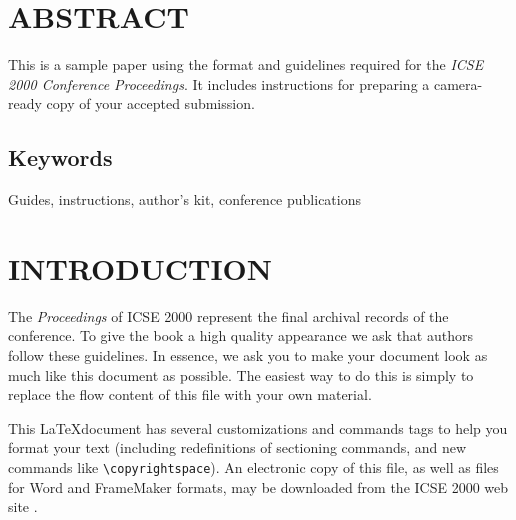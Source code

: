 
\thispagestyle{empty}  %




\section*{ABSTRACT}
This is a sample paper using the format and guidelines 
required for the {\it ICSE 2000 Conference Proceedings}. It 
includes instructions for preparing a camera-ready copy of 
your accepted submission.

\subsection{Keywords}
Guides, instructions, author's kit, conference publications

\section{INTRODUCTION}
The {\it Proceedings} of ICSE 2000 represent the final archival 
records of the conference. To give the book a high quality 
appearance we ask that authors follow these guidelines. In 
essence, we ask you to make your document look as much 
like this document as possible. The easiest way to do this is 
simply to replace the flow content of this file with your own 
material.
 
This \LaTeX document has several customizations and commands
tags to help you format your text (including redefinitions
of sectioning commands, and new commands like \verb|\copyrightspace|).
An electronic copy of this file, as well as files for Word and 
FrameMaker formats,
may be downloaded from the ICSE 2000 web site \cite{EAK}.

